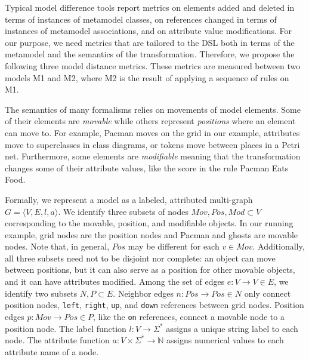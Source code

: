 Typical model difference tools report metrics on elements added and deleted in terms of instances of metamodel classes, on references changed in terms of instances of metamodel associations, and on attribute value modifications.
For our purpose, we need metrics that are tailored to the DSL both in terms of the metamodel and the semantics of the transformation.
Therefore, we propose the following three model distance metrics.
These metrics are measured between two models M1 and M2, where M2 is the result of applying a sequence of rules on M1.

The semantics of many formalisms relies on movements of model elements.
Some of their elements are \emph{movable} while others represent \emph{positions} where an element can move to.
For example, Pacman moves on the grid in our example, attributes move to superclasses in class diagrams, or tokens move between places in a Petri net.
Furthermore, some elements are \emph{modifiable} meaning that the transformation changes some of their attribute values, like the score in the rule Pacman Eats Food.

Formally, we represent a model as a labeled, attributed multi-graph $G=\langle V,E,l,a \rangle$.
We identify three subsets of nodes $Mov,Pos,Mod \subset V$ corresponding to the movable, position, and modifiable objects.
In our running example, grid nodes are the position nodes and Pacman and ghosts are movable nodes.
Note that, in general, $Pos$ may be different for each $v \in Mov$.
Additionally, all three subsets need not to be disjoint nor complete: an object can move between positions, but it can also serve as a position for other movable objects, and it can have attributes modified.
Among the set of edges $e:V \rightarrow V \in E$, we identify two subsets $N,P \subset E$.
Neighbor edges $n: Pos \rightarrow Pos \in N$ only connect position nodes, \eg \texttt{left}, \texttt{right}, \texttt{up}, and \texttt{down} references between grid nodes.
Position edges $p: Mov \rightarrow Pos \in P$, like the \texttt{on} references, connect a movable node to a position node.
The label function $l:V \rightarrow \Sigma^*$ assigns a unique string label to each node.
The attribute function $a:V \times \Sigma^* \rightarrow \mathbb{N}$ assigns numerical values to each attribute name of a node.

